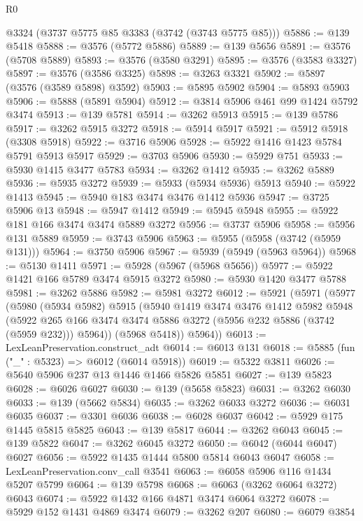\begin{lexlean}{R0}
\begin{coremodule}
    @3324
    (@3737 @5775 @85 @3383 (@3742 (@3743 @5775 @85)))
@5886 := @139 @5418
@5888 := @3576 (@5772 @5886)
@5889 := @139 @5656
@5891 := @3576 (@5708 @5889)
@5893 := @3576 (@3580 @3291)
@5895 := @3576 (@3583 @3327)
@5897 := @3576 (@3586 @3325)
@5898 := @3263 @3321
@5902 := @5897 (@3576 (@3589 @5898) @3592)
@5903 := @5895 @5902
@5904 := @5893 @5903
@5906 := @5888 (@5891 @5904)
@5912 := @3814 @5906 @461 @99 @1424 @5792 @3474
@5913 := @139 @5781
@5914 := @3262 @5913
@5915 := @139 @5786
@5917 := @3262 @5915 @3272
@5918 := @5914 @5917
@5921 := @5912 @5918 (@3308 @5918)
@5922 := @3716 @5906
@5928 := @5922 @1416 @1423 @5784 @5791 @5913 @5917
@5929 := @3703 @5906
@5930 := @5929 @751
@5933 := @5930 @1415 @3477 @5783
@5934 := @3262 @1412
@5935 := @3262 @5889
@5936 := @5935 @3272
@5939 := @5933 (@5934 @5936) @5913
@5940 := @5922 @1413
@5945 := @5940 @183 @3474 @3476 @1412 @5936
@5947 := @3725 @5906 @13
@5948 := @5947 @1412
@5949 := @5945 @5948
@5955 := @5922 @181 @166 @3474 @3474 @5889 @3272
@5956 := @3737 @5906
@5958 := @5956 @131 @5889
@5959 := @3743 @5906
@5963 := @5955 (@5958 (@3742 (@5959 @131)))
@5964 := @3750 @5906
@5967 := @5939 (@5949 (@5963 @5964))
@5968 := @5130 @1411
@5971 := @5928 (@5967 (@5968 @5656))
@5977 := @5922 @1421 @166 @5789 @3474 @5915 @3272
@5980 := @5930 @1420 @3477 @5788
@5981 := @3262 @5886
@5982 := @5981 @3272
@6012 := @5921
    (@5971
      (@5977
        (@5980
          (@5934 @5982)
          @5915
          (@5940
            @1419
            @3474
            @3476
            @1412
            @5982
            @5948
            (@5922 @265 @166 @3474 @3474 @5886 @3272 (@5956 @232 @5886 (@3742 (@5959 @232))) @5964))
          (@5968 @5418))
        @5964))
@6013 := LexLeanPreservation.construct_adt
@6014 := @6013 @131
@6018 := @5885 (fun ("_" : @5323) => @6012 (@6014 @5918))
@6019 := @5322 @3811
@6026 := @5640 @5906 @237 @13 @1446 @1466 @5826 @5851
@6027 := @139 @5823
@6028 := @6026 @6027
@6030 := @139 (@5658 @5823)
@6031 := @3262 @6030
@6033 := @139 (@5662 @5834)
@6035 := @3262 @6033 @3272
@6036 := @6031 @6035
@6037 := @3301 @6036
@6038 := @6028 @6037
@6042 := @5929 @175 @1445 @5815 @5825
@6043 := @139 @5817
@6044 := @3262 @6043
@6045 := @139 @5822
@6047 := @3262 @6045 @3272
@6050 := @6042 (@6044 @6047) @6027
@6056 := @5922 @1435 @1444 @5800 @5814 @6043 @6047
@6058 := LexLeanPreservation.conv_call @3541
@6063 := @6058 @5906 @116 @1434 @5207 @5799
@6064 := @139 @5798
@6068 := @6063 (@3262 @6064 @3272) @6043
@6074 := @5922 @1432 @166 @4871 @3474 @6064 @3272
@6078 := @5929 @152 @1431 @4869 @3474
@6079 := @3262 @207
@6080 := @6079 @3854

\end{coremodule}
\end{lexlean}
